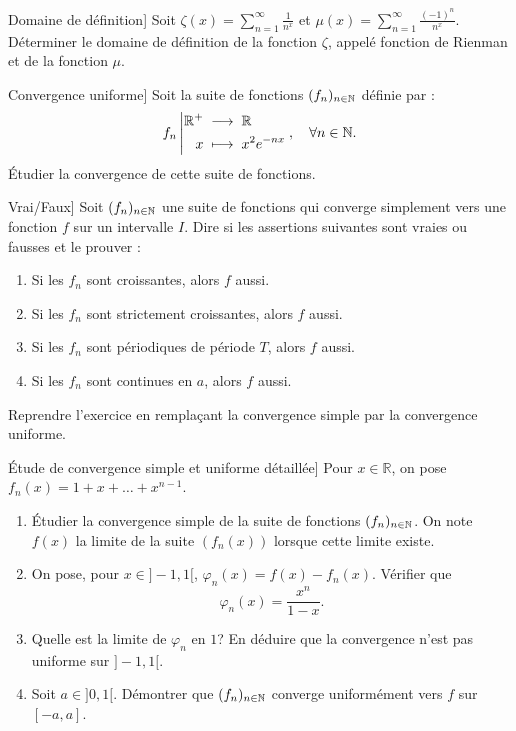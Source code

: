 \documentclass{book}
\begin{document}
\begin{Exercice}Domaine de définition]
Soit $\zeta(x)=\sum_{n=1}^\infty \frac{1}{n^x}$ et $\mu(x)=\sum_{n=1}^\infty \frac{(-1)^n}{n^x}$.\\
Déterminer le domaine de définition de la fonction $\zeta$, appelé fonction de Rienman et de la fonction $\mu$. 
\end{Exercice}
%
%
\begin{Exercice}Convergence uniforme]
Soit la suite de fonctions $(f_n)_{n\in\mathbb{N}}$ définie par : 
$${f_n}\left|\begin{aligned}{\mathbb{R}^+}&\;\longrightarrow\;{\mathbb{R}}\\{x}&\;\longmapsto\;{x^2e^{-nx}}\end{aligned}\right., \quad \forall n \in \mathbb{N}.$$
Étudier la convergence de cette suite de fonctions. 
\end{Exercice}
\begin{Exercice}Vrai/Faux]
Soit $(f_n)_{n\in\mathbb{N}}$ une suite de fonctions qui converge simplement vers une fonction $f$ sur un intervalle $I$. Dire si les assertions suivantes sont vraies ou fausses et le prouver :
\begin{enumerate}
\item Si les $f_n$ sont croissantes, alors $f$ aussi.
\item Si les $f_n$ sont strictement croissantes, alors $f$ aussi.
\item Si les $f_n$ sont périodiques de période $T$, alors $f$ aussi.
\item Si les $f_n$ sont continues en $a$, alors $f$ aussi.
\end{enumerate}
Reprendre l'exercice en remplaçant la convergence simple par la convergence uniforme.
\end{Exercice}
%
\begin{Exercice}\'Etude de convergence simple et uniforme détaillée]
Pour $x\in\mathbb R$, on pose $f_n(x)=1+x+\dots+x^{n-1}$.
\begin{enumerate}
\item \'Etudier la convergence simple de la suite de fonctions $(f_n)_{n\in\mathbb{N}}$. On note $f(x)$ la limite de la suite $(f_n(x))$ lorsque cette limite existe.
\item On pose, pour $x\in ]-1,1[$, $\varphi_n(x)=f(x)-f_n(x)$. Vérifier que 
$$\varphi_n(x)=\frac{x^n}{1-x}.$$
\item Quelle est la limite de $\varphi_n$ en $1$? En déduire que la convergence n'est pas uniforme sur $]-1,1[$. 
\item Soit $a\in ]0,1[$. Démontrer que $(f_n)_{n\in\mathbb{N}}$ converge uniformément vers $f$ sur $[-a,a]$.
\end{enumerate}
\end{Exercice}
\end{document}

